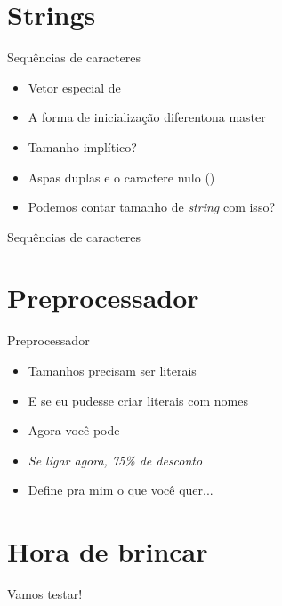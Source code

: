 \documentclass[14pt]{beamer}
\begin{document}
	\section{Strings}
		\begin{frame}{Sequências de caracteres}
			\begin{itemize}
				\presentationPause\item Vetor especial de 
				\presentationPause\item A forma de inicialização diferentona master
				\presentationPause
				\presentationPause\item Tamanho implítico?
				\presentationPause\item Aspas duplas \presentationPause e o caractere nulo ()
				\presentationPause\item Podemos contar tamanho de \textit{string} com isso?
			\end{itemize}
		\end{frame}

		\begin{frame}{Sequências de caracteres}
			\presentationPause
		\end{frame}
		
	\section{Preprocessador}
		\begin{frame}{Preprocessador}
			\begin{itemize}
				\presentationPause\item Tamanhos precisam ser literais
				\presentationPause\item E se eu pudesse criar literais com nomes
				\presentationPause\item Agora você pode
				\presentationPause\item \emph{Se ligar agora, 75\% de desconto}
				\presentationPause\item Define pra mim o que você quer... \presentationPause{}
			\end{itemize}
			\presentationPause
		\end{frame}
	

	\section{Hora de brincar}
		\begin{frame}
			\begin{center}\Huge
				Vamos testar!
			\end{center}
		\end{frame}
\end{document}
